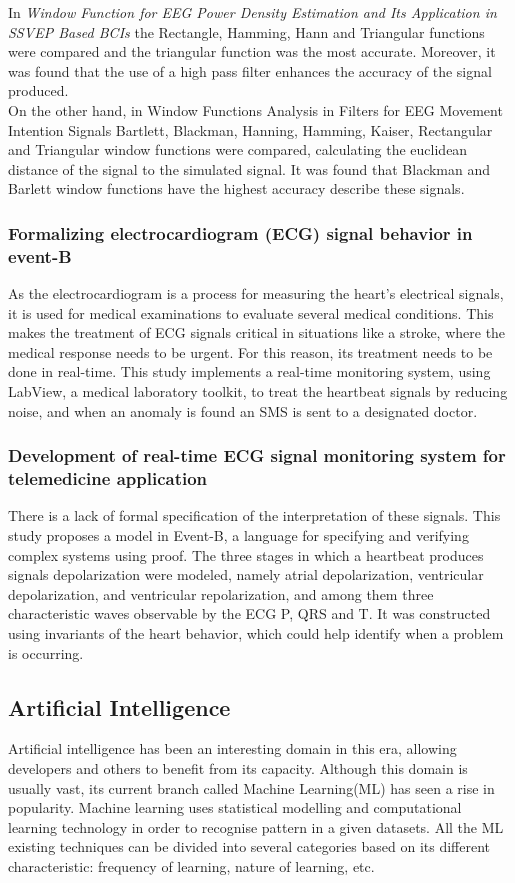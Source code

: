 In \textit{Window Function for EEG Power Density Estimation and Its Application in SSVEP Based BCIs} the Rectangle, Hamming, Hann and Triangular functions were compared and the triangular function was the most accurate. Moreover, it was found that the use of a high pass filter enhances the accuracy of the signal produced.\\

On the other hand, in Window Functions Analysis in Filters for EEG Movement Intention Signals Bartlett, Blackman, Hanning, Hamming, Kaiser, Rectangular and Triangular window functions were compared, calculating the euclidean distance of the signal to the simulated signal. It was found that Blackman and Barlett window functions have the highest accuracy describe these signals.

\subsubsection{Formalizing electrocardiogram (ECG) signal behavior in event-B}

As the electrocardiogram is a process for measuring the heart's electrical signals, it is used for medical examinations to evaluate several medical conditions. This makes the treatment of ECG signals critical in situations like a stroke, where the medical response needs to be urgent. For this reason, its treatment needs to be done in real-time. This study implements a real-time monitoring system, using LabView, a medical laboratory toolkit, to treat the heartbeat signals by reducing noise, and when an anomaly is found an SMS is sent to a designated doctor.

\subsubsection{Development of real-time ECG signal monitoring system for telemedicine application}
There is a lack of formal specification of the interpretation of these signals. This study proposes a model in Event-B, a language for specifying and verifying complex systems using proof. The three stages in which a heartbeat produces signals depolarization were modeled, namely atrial depolarization, ventricular depolarization, and ventricular repolarization, and among them three characteristic waves observable by the ECG P, QRS and T. It was constructed using invariants of the heart behavior, which could help identify when a problem is occurring.


\subsection{Artificial Intelligence} 
Artificial intelligence has been an interesting domain in this era, allowing developers and others to benefit from its capacity. Although this domain is usually vast, its current branch called Machine Learning(ML) has seen a rise in popularity. Machine learning uses statistical modelling and computational learning technology in order to recognise pattern in a given datasets. All the ML existing techniques can be divided into several categories based on its different characteristic: frequency of learning, nature of learning, etc.

